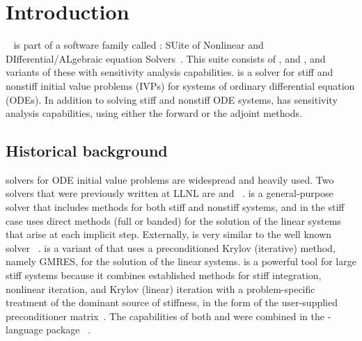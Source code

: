 \chapter{Introduction}\label{s:intro}

{\cvodes}~\cite{SeHi:05} is part of a software family called {\sundials}: 
SUite of Nonlinear and DIfferential/ALgebraic equation Solvers~\cite{HBGLSSW:05}.  
This suite consists of {\cvode}, {\kinsol} and {\ida}, and variants of these
with sensitivity analysis capabilities.
%
{\cvodes} is a solver for
stiff and nonstiff initial value problems (IVPs) for systems of
ordinary differential equation (ODEs). In addition to solving stiff
and nonstiff ODE systems, {\cvodes} has sensitivity analysis
capabilities, using either the forward or the adjoint methods.

\section{Historical background}\label{ss:history}

 {\F}
solvers for ODE initial value problems are widespread and heavily
used.  Two solvers that were previously written at LLNL are {\vode}
\cite{BBH:89} and {\vodpk}~\cite{Byr:92}.  {\vode}
is a general-purpose solver that includes methods for both stiff and
nonstiff systems, and in the stiff case uses direct methods (full or
banded) for the solution of the linear systems that arise at each
implicit step. Externally, {\vode} is very similar to the well known
solver {\lsode}~\cite{RaHi:94}.
{\vodpk} is a variant of {\vode} that uses a
preconditioned Krylov (iterative) method, namely GMRES, for the
solution of the linear systems. {\vodpk} is a powerful tool for large
stiff systems because it combines established methods for stiff
integration, nonlinear iteration, and Krylov (linear) iteration with a
problem-specific treatment of the dominant source of stiffness, in the
form of the user-supplied preconditioner matrix~\cite{BrHi:89}.  The
capabilities of both {\vode} and {\vodpk} were combined in the
{\C}-language package {\cvode}~\cite{CoHi:94,
CoHi:96}.

